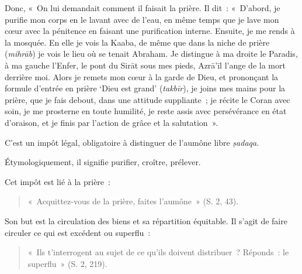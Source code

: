 Donc, «~On lui demandait comment il faisait la prière. Il dit~:
«~D'abord, je purifie mon corps en le lavant avec de l'eau, en même
temps que je lave mon cœur avec la pénitence en faisant une purification
interne. Ensuite, je me rends à la mosquée. En elle je vois la Kaaba, de
même que dans la niche de prière (\emph{mihrāb}) je vois le lieu où se
tenait Abraham. Je distingue à ma droite le Paradis, à ma gauche
l'Enfer, le pont du Sirāt sous mes pieds, Azrā'īl l'ange de la mort
derrière moi. Alors je remets mon cœur à la garde de Dieu, et prononçant
la formule d'entrée en prière `Dieu est grand' (\emph{takbīr}), je joins
mes mains pour la prière, que je fais debout, dans une attitude
suppliante~; je récite le Coran avec soin, je me prosterne en toute
humilité, je reste assis avec persévérance en état d'oraison, et je
finis par l'action de grâce et la salutation~».





C'est un impôt légal, obligatoire à distinguer de l'aumône libre
\emph{ṣadaqa}.

Étymologiquement, il signifie purifier, croître, prélever.

Cet impôt est lié à la prière~: 
\begin{quote}
    
«~Acquittez-vous de la prière, faites
l'aumône~» (S. 2, 43).
\end{quote}

Son but est la circulation des biens et sa répartition équitable. Il
s'agit de faire circuler ce qui est excédent ou superflu~:

\begin{quote}
«~Ils t'interrogent au sujet de ce qu'ils doivent distribuer~? Réponds~:
le superflu~» (S. 2, 219).
\end{quote}

